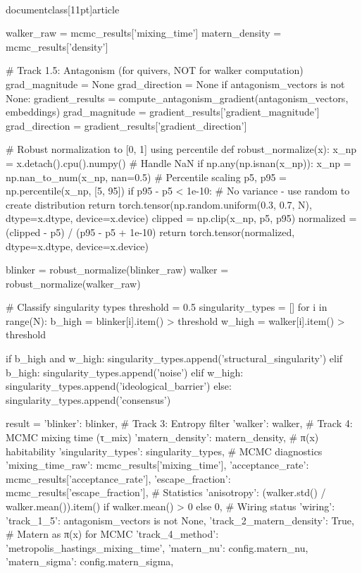 \\documentclass[11pt]{article}
\begin{document}
\begin{CodeBlock}
    walker_raw = mcmc_results['mixing_time']
    matern_density = mcmc_results['density']

    # Track 1.5: Antagonism (for quivers, NOT for walker computation)
    grad_magnitude = None
    grad_direction = None
    if antagonism_vectors is not None:
        gradient_results = compute_antagonism_gradient(antagonism_vectors, embeddings)
        grad_magnitude = gradient_results['gradient_magnitude']
        grad_direction = gradient_results['gradient_direction']

    # Robust normalization to [0, 1] using percentile
    def robust_normalize(x):
        x_np = x.detach().cpu().numpy()
        # Handle NaN
        if np.any(np.isnan(x_np)):
            x_np = np.nan_to_num(x_np, nan=0.5)
        # Percentile scaling
        p5, p95 = np.percentile(x_np, [5, 95])
        if p95 - p5 < 1e-10:
            # No variance - use random to create distribution
            return torch.tensor(np.random.uniform(0.3, 0.7, N), dtype=x.dtype, device=x.device)
        clipped = np.clip(x_np, p5, p95)
        normalized = (clipped - p5) / (p95 - p5 + 1e-10)
        return torch.tensor(normalized, dtype=x.dtype, device=x.device)

    blinker = robust_normalize(blinker_raw)
    walker = robust_normalize(walker_raw)

    # Classify singularity types
    threshold = 0.5
    singularity_types = []
    for i in range(N):
        b_high = blinker[i].item() > threshold
        w_high = walker[i].item() > threshold

        if b_high and w_high:
            singularity_types.append('structural_singularity')
        elif b_high:
            singularity_types.append('noise')
        elif w_high:
            singularity_types.append('ideological_barrier')
        else:
            singularity_types.append('consensus')

    result = {
        'blinker': blinker,           # Track 3: Entropy filter
        'walker': walker,             # Track 4: MCMC mixing time (τ_mix)
        'matern_density': matern_density,  # π(x) habitability
        'singularity_types': singularity_types,
        # MCMC diagnostics
        'mixing_time_raw': mcmc_results['mixing_time'],
        'acceptance_rate': mcmc_results['acceptance_rate'],
        'escape_fraction': mcmc_results['escape_fraction'],
        # Statistics
        'anisotropy': (walker.std() / walker.mean()).item() if walker.mean() > 0 else 0,
        # Wiring status
        'wiring': {
            'track_1_5': antagonism_vectors is not None,
            'track_2_matern_density': True,  # Matern as π(x) for MCMC
            'track_4_method': 'metropolis_hastings_mixing_time',
            'matern_nu': config.matern_nu,
            'matern_sigma': config.matern_sigma,
        }
    }


\end{CodeBlock}
\end{document}
